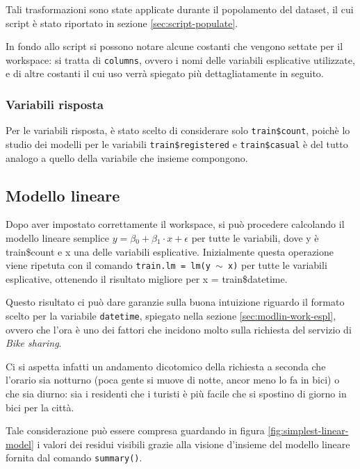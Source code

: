 Tali trasformazioni sono state applicate durante il popolamento del dataset, il
cui script è stato riportato in sezione \ref{sec:script-populate}.

In fondo allo script si possono notare alcune costanti che vengono settate per
il workspace: si tratta di \texttt{columns}, ovvero i nomi delle variabili
esplicative utilizzate, e di altre costanti il cui uso verrà spiegato più
dettagliatamente in seguito.

\subsubsection{Variabili risposta}\label{sec:lin-risp}
Per le variabili risposta, è stato scelto di considerare solo
\texttt{train\$count}, poichè lo studio dei modelli per le variabili
\texttt{train\$registered} e \texttt{train\$casual} è del tutto analogo a
quello della variabile che insieme compongono.


\subsection{Modello lineare}\label{sec:mod-lin}
Dopo aver impostato correttamente il workspace, si può procedere calcolando il
modello lineare semplice $ y = \beta{}_0 + \beta{}_1 \cdot{} x + \epsilon{} $
per tutte le variabili, dove y è train\$count e x una delle variabili
esplicative.
Inizialmente questa operazione viene ripetuta con il comando \texttt{train.lm
= lm(y $ \sim{} $ x)} per tutte le variabili esplicative, ottenendo il
risultato migliore per x = train\$datetime.

Questo risultato ci può dare garanzie sulla buona intuizione riguardo il
formato scelto per la variabile \texttt{datetime}, spiegato nella sezione
\ref{sec:modlin-work-espl}, ovvero che l'ora è uno dei fattori che incidono
molto sulla richiesta del servizio di \emph{Bike sharing}.

Ci si aspetta infatti un andamento dicotomico della richiesta a seconda che
l'orario sia notturno (poca gente si muove di notte, ancor meno lo fa in bici)
o che sia diurno: sia i residenti che i turisti è più facile che si spostino di
giorno in bici per la città.

Tale considerazione può essere compresa guardando in figura
\ref{fig:simplest-linear-model} i valori dei residui visibili grazie alla
visione d'insieme del modello lineare fornita dal comando \texttt{summary()}.

